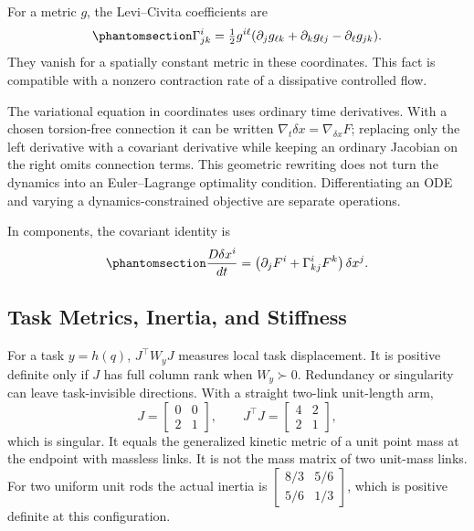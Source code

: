 \documentclass[
  10pt,
  letterpaper,
  DIV=11,
  numbers=noendperiod]{scrartcl}
\begin{document}
For a metric \(g\), the Levi--Civita coefficients are
\begin{equation}\phantomsection\label{eq-christoffel}{
\Gamma^i_{jk}=\tfrac12g^{i\ell}(\partial_jg_{\ell k}+\partial_kg_{\ell j}-\partial_\ell g_{jk}).
}\end{equation} They vanish for a spatially constant metric in these
coordinates. This fact is compatible with a nonzero contraction rate of
a dissipative controlled flow.

The variational equation in coordinates uses ordinary time derivatives.
With a chosen torsion-free connection it can be written
\(\nabla_t\delta x=\nabla_{\delta x}F\); replacing only the left
derivative with a covariant derivative while keeping an ordinary
Jacobian on the right omits connection terms. This geometric rewriting
does not turn the dynamics into an Euler--Lagrange optimality condition.
Differentiating an ODE and varying a dynamics-constrained objective are
separate operations.

In components, the covariant identity is
\begin{equation}\phantomsection\label{eq-tangent-bundle-dynamics}{
\frac{D\delta x^i}{dt}=\left(\partial_jF^i+\Gamma^i_{kj}F^k\right)\delta x^j.
}\end{equation}

\subsection{Task Metrics, Inertia, and
Stiffness}\label{task-metrics-inertia-and-stiffness}

For a task \(y=h(q)\), \(J^\top W_yJ\) measures local task displacement.
It is positive definite only if \(J\) has full column rank when
\(W_y\succ0\). Redundancy or singularity can leave task-invisible
directions. With a straight two-link unit-length arm, \[
J=\begin{bmatrix}0&0\\2&1\end{bmatrix},\qquad
J^\top J=\begin{bmatrix}4&2\\2&1\end{bmatrix},
\] which is singular. It equals the generalized kinetic metric of a unit
point mass at the endpoint with massless links. It is not the mass
matrix of two unit-mass links. For two uniform unit rods the actual
inertia is
\(\left[\begin{smallmatrix}8/3&5/6\\5/6&1/3\end{smallmatrix}\right]\),
which is positive definite at this configuration.
\end{document}
